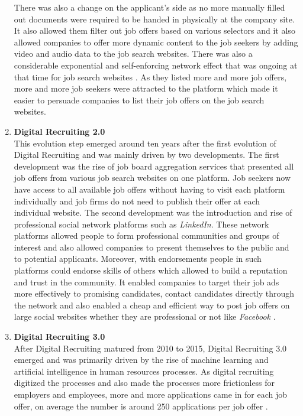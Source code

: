 \documentclass[draft,final]{thesisclass} %
\begin{document}
\begin{enumerate}
    There was also a change on the applicant's side as no more manually filled out documents were required to be handed in physically at the company site.
    It also allowed them filter out job offers based on various selectors and it also allowed companies to offer more dynamic content to the job seekers by adding video and audio data to the job search websites.
    There was also a considerable exponential and self-enforcing network effect that was ongoing at that time for job search websites \cite[3]{ai_recruiting}.
    As they listed more and more job offers, more and more job seekers were attracted to the platform which made it easier to persuade companies to list their job offers on the job search websites.
    \item \textbf{Digital Recruiting 2.0} \label{digital_recruiting_2}\\
    This evolution step emerged around ten years after the first evolution of Digital Recruiting and was mainly driven by two developments.
    The first development was the rise of job board aggregation services that presented all job offers from various job search websites on one platform.
    Job seekers now have access to all available job offers without having to visit each platform individually and job firms do not need to publish their offer at each individual website.
    The second development was the introduction and rise of professional social network platforms such as \textit{LinkedIn}.
    These network platforms allowed people to form professional communities and groups of interest and also allowed companies to present themselves to the public and to potential applicants.
    Moreover, with endorsements people in such platforms could endorse skills of others which allowed to build a reputation and trust in the community.
    It enabled companies to target their job ads more effectively to promising candidates, contact candidates directly through the network and also enabled a cheap and efficient way to post job offers on large social websites whether they are professional or not like \textit{Facebook} \cite[3]{ai_recruiting}.
    \item \textbf{Digital Recruiting 3.0} \label{digital_recruiting_3}\\
    After Digital Recruiting matured from 2010 to 2015, Digital Recruiting 3.0 emerged and was primarily driven by the rise of machine learning and artificial intelligence in human resources processes.
    As digital recruiting digitized the processes and also made the processes more frictionless for employers and employees, more and more applications came in for each job offer, on average the number is around 250 applications per job offer \cite[4]{ai_recruiting}. 

\end{enumerate}
\end{document}
